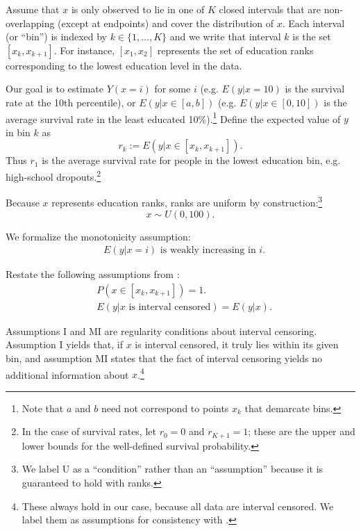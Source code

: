 \documentclass[12pt,letterpaper]{article}
\numberwithin{equation}{section}
\begin{document}
Assume that $x$ is only observed to lie in one of $K$ closed intervals
that are non-overlapping (except at endpoints) and cover the
distribution of $x$. Each interval (or ``bin'') is indexed by $k \in
\{1,\dots,K\}$ and we write that interval $k$ is the set $[x_k,x_{k+1}]$. For instance,
$[x_1,x_2]$ represents the set of education ranks corresponding to the
lowest education level in the data.

Our goal is to estimate $Y(x=i)$ for some $i$ (e.g. $E(y|x=10)$ is the
survival rate at the 10th percentile), or $E(y|x \in [a, b])$
(e.g. $E(y|x \in [0, 10])$ is the average survival rate in the least
educated 10\%).\footnote{Note that $a$ and $b$ need not correspond to points
$x_k$ that demarcate bins.} Define the expected value of $y$ in bin $k$ as $$r_k
:= E(y | x \in [x_k, x_{k+1}]).$$ Thus $r_1$ is the average survival rate for people in the lowest education bin, e.g. high-school dropouts.\footnote{In the case of survival rates, let $r_0=0$ and $r_{K+1} = 1$; these are the upper and lower bounds for the well-defined survival probability.}

Because $x$ represents education ranks, ranks are uniform by construction:\footnote{We label U as a ``condition'' rather than an ``assumption'' because it is guaranteed to hold with ranks.}
\begin{equation}
x \sim U(0,100).  \tag{Condition U}
\end{equation}

We formalize the monotonicity assumption:
\begin{align*}
  \tag{Assumption M} &E(y|x=i) \text{ is weakly increasing in } i.
\end{align*} 

Restate the following assumptions from \citet{Manski2002}:
\begin{align*}
 \tag{Assumption I} 
  &P(x \in [x_{k}, x_{k+1}]) = 1. \\
  \tag{Assumption MI} 
  &E( y \vert x \text{ is interval censored}) = E(y
  \vert x). 
\end{align*}

Assumptions I and MI are regularity conditions about interval
censoring. Assumption I yields that, if $x$ is interval censored, it
truly lies within its given bin, and assumption MI states that the
fact of interval censoring yields no additional information about
$x$.\footnote{These always hold in our case, because all data are interval censored.
  We label them as assumptions for consistency with \citet{Manski2002}.}
\end{document}
